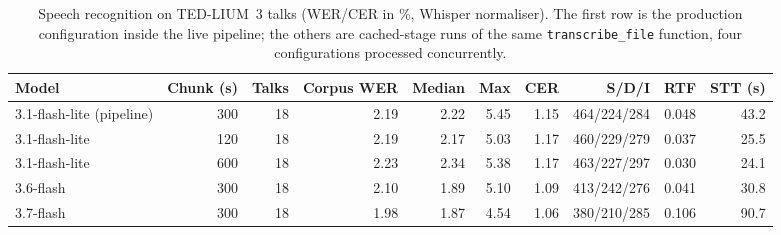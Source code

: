 \begin{table}[t]
\centering
\caption{Speech recognition on TED-LIUM~3 talks (WER/CER in \%, Whisper normaliser). The first row is the production configuration inside the live pipeline; the others are cached-stage runs of the same \texttt{transcribe\_file} function, four configurations processed concurrently.}
\label{tab:asr}
\footnotesize
\setlength{\tabcolsep}{3.5pt}
\begin{tabular}{lrrrrrrrrr}
\toprule
Model & Chunk (s) & Talks & Corpus WER & Median & Max & CER & S/D/I & RTF & STT (s) \\
\midrule
3.1-flash-lite (pipeline) & 300 & 18 & 2.19 & 2.22 & 5.45 & 1.15 & 464/224/284 & 0.048 & 43.2 \\
3.1-flash-lite & 120 & 18 & 2.19 & 2.17 & 5.03 & 1.17 & 460/229/279 & 0.037 & 25.5 \\
3.1-flash-lite & 600 & 18 & 2.23 & 2.34 & 5.38 & 1.17 & 463/227/297 & 0.030 & 24.1 \\
3.6-flash & 300 & 18 & 2.10 & 1.89 & 5.10 & 1.09 & 413/242/276 & 0.041 & 30.8 \\
3.7-flash & 300 & 18 & 1.98 & 1.87 & 4.54 & 1.06 & 380/210/285 & 0.106 & 90.7 \\
\bottomrule
\end{tabular}
\end{table}
